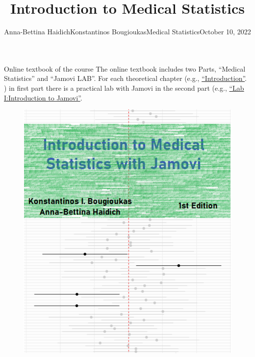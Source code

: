 \documentclass[
  ignorenonframetext,
]{beamer}
\title{Introduction to Medical Statistics}
\author{Anna-Bettina HaidichKonstantinos BougioukasMedical
StatisticsOctober 10, 2022}
\date{}
\begin{document}
\frame{\titlepage}
\ifdefined\Shaded\renewenvironment{Shaded}{\begin{tcolorbox}[sharp corners, interior hidden, boxrule=0pt, borderline west={3pt}{0pt}{shadecolor}, frame hidden, enhanced, breakable]}{\end{tcolorbox}}\fi

\begin{frame}{Online textbook of the course}
\protect\hypertarget{online-textbook-of-the-course}{}
The online textbook includes two Parts, ``Medical Statistics'' and
``Jamovi LAB''. For each theoretical chapter (e.g.,
\href{https://bougioukas-medstatsjamovi.netlify.app/introduction.html}{``Introduction''}.
) in first part there is a practical lab with Jamovi in the second part
(e.g.,
\href{https://bougioukas-medstatsjamovi.netlify.app/lab1.html}{``Lab
I:Introduction to Jamovi''}.

\begin{figure}

\hfill{} \includegraphics{images_slides/cover2.png}

\end{figure}
\end{frame}
\end{document}
